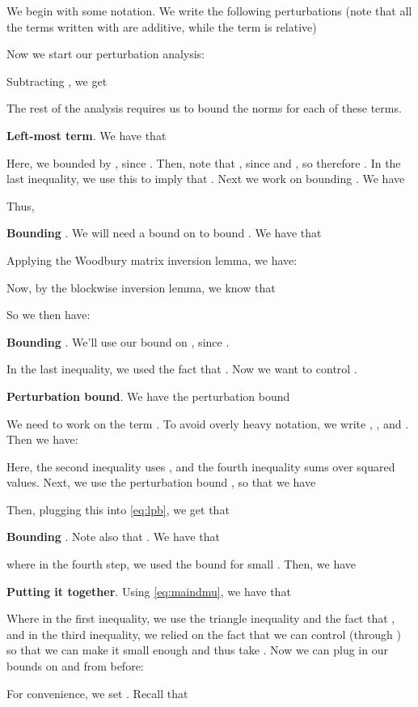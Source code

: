\documentclass[letterpaper]{article}
\begin{document}
\begin{appendix}
We begin with some notation. We write the following perturbations (note that all the terms written with  are additive, while the  term is relative)


Now we start our perturbation analysis:


Subtracting , we get


The rest of the analysis requires us to bound the norms for each of these terms. 

{\bf Left-most term}. We have that


Here, we bounded  by , since . 
Then, note that , since  and , so therefore .
In the last inequality, we use this to imply that . 
Next we work on bounding . We have


Thus,


{\bf Bounding }. We will need a bound on  to bound . We have that 
	
Applying the Woodbury matrix inversion lemma, we have:

Now, by the blockwise inversion lemma, we know that

So we then have:


{\bf Bounding }. We'll  use our bound on , since . 


In the last inequality, we used the fact that . Now we want to control .  

{\bf Perturbation bound}. We have the perturbation bound


We need to work on the term . To avoid overly heavy notation, we write , , and . 
Then we have:

Here, the second inequality uses , and the fourth inequality sums over squared values. Next, we use the perturbation bound , so that we have 


Then, plugging this into \eqref{eq:lpb}, we get that



{\bf Bounding} . Note also that . We have that

where in the fourth step, we used the bound  for small . Then, we have

 
{\bf Putting it together}.
Using \eqref{eq:maindmu}, we have that

Where in the first inequality, we use the triangle inequality and the fact that , and in the third inequality, we relied on the fact that we can control  (through ) so that we can make it small enough and thus take .
Now we can plug in our bounds on  and  from before:


For convenience, we set .
Recall that


\end{appendix}
\end{document}
